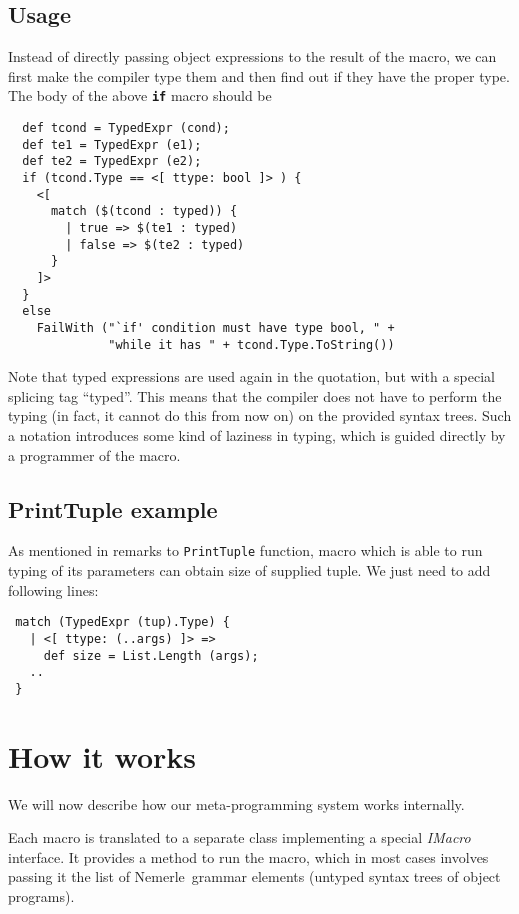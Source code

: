 \documentclass{llncs}
\newcommand{\nem}[0]{Nemerle}
\newcommand{\kw}[1]{{\tt \bf #1}}
\begin{document}
\subsection{Usage}
Instead of directly passing object expressions to the result of the macro, we
can first make the compiler type them and then find out if they have the proper
type. The body of the above \kw{if} macro should be

\begin{verbatim}
  def tcond = TypedExpr (cond);
  def te1 = TypedExpr (e1);
  def te2 = TypedExpr (e2);
  if (tcond.Type == <[ ttype: bool ]> ) {
    <[ 
      match ($(tcond : typed)) { 
        | true => $(te1 : typed) 
        | false => $(te2 : typed) 
      } 
    ]>
  }
  else
    FailWith ("`if' condition must have type bool, " +
              "while it has " + tcond.Type.ToString())
\end{verbatim}

Note that typed expressions are used again in the quotation, but with a special 
splicing tag ``typed''. This means that the compiler does not have to perform the 
typing (in fact, it cannot do this from now on) on the provided syntax trees. 
Such a notation introduces some kind of laziness in typing, which is guided
directly by a programmer of the macro.

\subsection{PrintTuple example}
As mentioned in remarks to \verb,PrintTuple, function, macro which is able to run 
typing of its parameters can obtain size of supplied tuple. We just need to add
following lines:

\begin{verbatim}
 match (TypedExpr (tup).Type) {
   | <[ ttype: (..args) ]> =>
     def size = List.Length (args);
   ..
 }
\end{verbatim}

\section{How it works}
We will now describe how our meta-programming system works internally. 

Each macro is translated to a separate class implementing a special
\emph{IMacro} interface. It provides a method to run the macro, which
in most cases involves passing it the list of \nem\ grammar elements
(untyped syntax trees of object programs).
\end{document}
